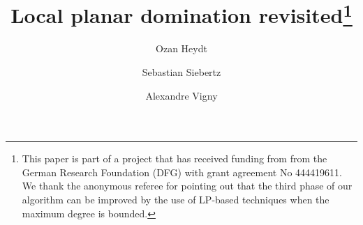 \documentclass[runningheads,a4paper]{llncs}
\begin{document}
%
\title{Local planar domination revisited\thanks{This paper is part of a project that has received funding from from the German
	Research Foundation (DFG) with grant agreement
	No 444419611.\\[1mm]
	We thank the anonymous
referee for pointing out that the third phase of our algorithm can be
improved by the use of LP-based techniques when the maximum
degree is bounded.}}
%
%
\author{Ozan Heydt \and
Sebastian Siebertz \and%
Alexandre Vigny}
%
%
%
\maketitle              %
%

















%

%
%
%
 
 

%
% 
%
\end{document}
